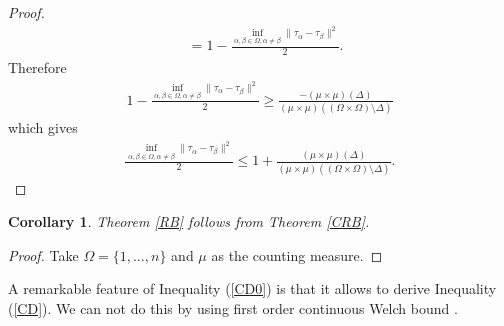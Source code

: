 \documentclass{amsart}
\newtheorem{corollary}[theorem] {Corollary}
\begin{document}
\begin{proof}
\begin{align*}
&=1-\frac{\inf _{\alpha, \beta \in \Omega, \alpha\neq \beta}\|\tau_\alpha-\tau_\beta\|^2}{2}.
\end{align*}
Therefore 
\begin{align*}
1-\frac{\inf _{\alpha, \beta \in \Omega, \alpha\neq \beta}\|\tau_\alpha-\tau_\beta\|^2}{2}\geq 	\frac{-(\mu\times\mu)(\Delta)}{(\mu\times\mu)((\Omega\times\Omega)\setminus\Delta)}
\end{align*}
which gives 
\begin{align*}
\frac{\inf _{\alpha, \beta \in \Omega, \alpha\neq \beta}\|\tau_\alpha-\tau_\beta\|^2}{2}\leq 1+\frac{(\mu\times\mu)(\Delta)}{(\mu\times\mu)((\Omega\times\Omega)\setminus\Delta)}.	
\end{align*}
\end{proof}
\begin{corollary}
	Theorem  \ref{RB}    follows from  Theorem 	\ref{CRB}.
\end{corollary}
\begin{proof}
	Take $\Omega=\{1,\dots,n\} $ and $\mu$ as the counting measure.
\end{proof}
A remarkable feature of Inequality (\ref{CD0}) is that it allows to derive  Inequality (\ref{CD}). We can not do this  by using   first order continuous Welch bound \cite{KRISHNA}. 
\end{document}
